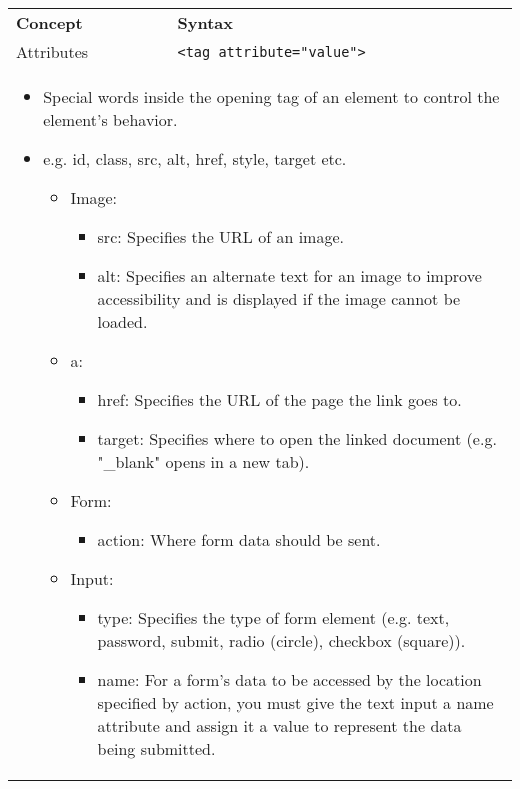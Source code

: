 \begin{summary}
    \begin{center}
        \begin{tabular}{ll}
            \textbf{Concept} & \textbf{Syntax} \\ 
            Attributes & \texttt{<tag attribute="value">} \\
            \multicolumn{2}{p{\linewidth}}{\begin{itemize}
                \item Special words inside the opening tag of an element to control the element's behavior.
                \item e.g. id, class, src, alt, href, style, target etc.
                \begin{itemize}
                    \item Image:
                    \begin{itemize}
                        \item src: Specifies the URL of an image.
                        \item alt: Specifies an alternate text for an image to improve accessibility and is displayed if the image cannot be loaded.
                    \end{itemize}
                    \item a: 
                    \begin{itemize}
                        \item href: Specifies the URL of the page the link goes to.
                        \item target: Specifies where to open the linked document (e.g. "\_blank" opens in a new tab).
                    \end{itemize}
                    \item Form:
                    \begin{itemize}
                        \item action: Where form data should be sent. 
                    \end{itemize}
                    \item Input: 
                    \begin{itemize}
                        \item type: Specifies the type of form element (e.g. text, password, submit, radio (circle), checkbox (square)).
                        \item name: For a form's data to be accessed by the location specified by action, you must give the text input a name attribute and assign it a value to represent the data being submitted.

\end{itemize}
\end{itemize}
\end{itemize}}
\end{tabular}
\end{center}
\end{summary}
